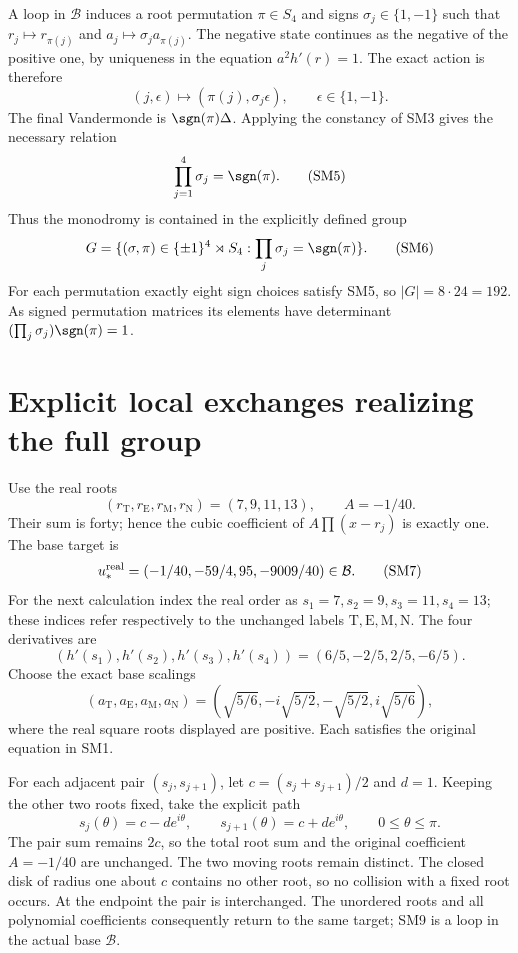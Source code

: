 \documentclass[11pt]{article}
\begin{document}
A loop in $\mathcal B$ induces a root permutation $\pi\in S_4$
and signs $\sigma_j\in\{1,-1\}$ such that
$r_j\mapsto r_{\pi(j)}$ and $a_j\mapsto\sigma_j a_{\pi(j)}$.
The negative state continues as the negative of the positive one,
by uniqueness in the equation $a^2h'(r)=1$. The exact action is
therefore
\begin{equation}
 (j,\epsilon)\longmapsto(\pi(j),\sigma_j\epsilon),
 \qquad \epsilon\in\{1,-1\}.\tag{SM4}
\end{equation}
The final Vandermonde is $\sgn(\pi)\Delta$. Applying the
constancy of SM3 gives the necessary relation
\begin{equation}
 \prod_{j=1}^4\sigma_j=\sgn(\pi).\tag{SM5}
\end{equation}
Thus the monodromy is contained in the explicitly defined group
\begin{equation}
 G=\{(\sigma,\pi)\in\{\pm1\}^4\rtimes S_4:
                       \prod_j\sigma_j=\sgn(\pi)\}.
 \tag{SM6}
\end{equation}
For each permutation exactly eight sign choices satisfy SM5, so
$|G|=8\cdot24=192$. As signed permutation matrices its elements
have determinant $(\prod_j\sigma_j)\sgn(\pi)=1$.

\section{Explicit local exchanges realizing the full group}
Use the real roots
\[
 (r_{\mathrm T},r_{\mathrm E},r_{\mathrm M},r_{\mathrm N})
 =(7,9,11,13),\qquad A=-1/40.
\]
Their sum is forty; hence the cubic coefficient of
$A\prod(x-r_j)$ is exactly one. The base target is
\begin{equation}
 u_*^{\rm real}=(-1/40,-59/4,95,-9009/40)\in\mathcal B.
 \tag{SM7}
\end{equation}
For the next calculation index the real order as
$s_1=7,s_2=9,s_3=11,s_4=13$; these indices refer respectively
to the unchanged labels $\mathrm T,\mathrm E,\mathrm M,\mathrm N$.
The four derivatives are
\[
 (h'(s_1),h'(s_2),h'(s_3),h'(s_4))
       =(6/5,-2/5,2/5,-6/5).
\]
Choose the exact base scalings
\begin{equation}
 (a_{\mathrm T},a_{\mathrm E},a_{\mathrm M},a_{\mathrm N})
 =\left(\sqrt{5/6},-i\sqrt{5/2},-\sqrt{5/2},i\sqrt{5/6}\right),
 \tag{SM8}
\end{equation}
where the real square roots displayed are positive. Each satisfies
the original equation in SM1.

For each adjacent pair $(s_j,s_{j+1})$, let
$c=(s_j+s_{j+1})/2$ and $d=1$. Keeping the other two roots fixed,
take the explicit path
\begin{equation}
 s_j(\theta)=c-d e^{i\theta},\qquad
 s_{j+1}(\theta)=c+d e^{i\theta},\qquad0\le\theta\le\pi.
 \tag{SM9}
\end{equation}
The pair sum remains $2c$, so the total root sum and the original
coefficient $A=-1/40$ are unchanged. The two moving roots remain
distinct. The closed disk of radius one about $c$ contains no
other root, so no collision with a fixed root occurs. At the
endpoint the pair is interchanged. The unordered roots and all
polynomial coefficients consequently return to the same target;
SM9 is a loop in the actual base $\mathcal B$.
\end{document}
